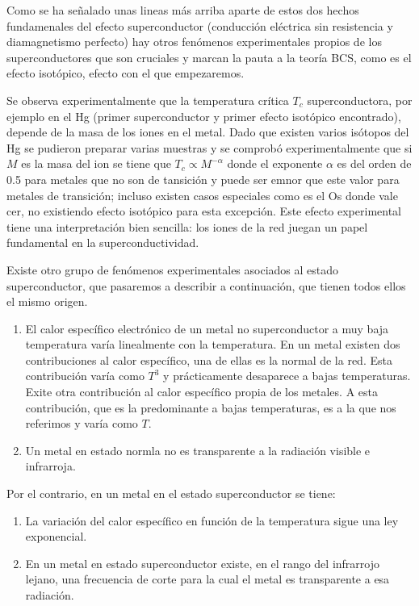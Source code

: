 Como se ha señalado unas lineas más arriba aparte de estos dos hechos fundamenales del efecto superconductor (conducción eléctrica sin resistencia y diamagnetismo perfecto) hay otros fenómenos experimentales propios de los superconductores que son cruciales y marcan la pauta a la teoría BCS, como es el efecto isotópico, efecto con el que empezaremos.

Se observa experimentalmente que la temperatura crítica $T_c$ superconductora, por ejemplo en el Hg (primer superconductor y primer efecto isotópico encontrado), depende de la masa de los iones en el metal. Dado que existen varios isótopos del Hg se pudieron preparar varias muestras y se comprobó experimentalmente que si $M$ es la masa del ion se tiene que $T_c \propto M^{-\alpha}$ donde el exponente $\alpha$ es del orden de 0.5 para metales que no son de tansición y puede ser emnor que este valor para metales de transición; incluso existen casos especiales como es el Os donde vale cer, no existiendo efecto isotópico para esta excepción. Este efecto experimental tiene una interpretación bien sencilla: los iones de la red juegan un papel fundamental en la superconductividad.

Existe otro grupo de fenómenos experimentales asociados al estado superconductor, que pasaremos a describir a continuación, que tienen todos ellos el mismo origen.

\begin{enumerate}
    \item El calor específico electrónico de un metal no superconductor a muy baja temperatura varía linealmente con la temperatura. En un metal existen dos contribuciones al calor específico, una de ellas es la normal de la red. Esta contribución varía como $T^3$ y prácticamente desaparece a bajas temperaturas. Exite otra contribución al calor específico propia de los metales. A esta contribución, que es la predominante a bajas temperaturas, es a la que nos referimos y varía como $T$.
    \item Un metal en estado normla no es transparente a la radiación visible e infrarroja.
\end{enumerate}

Por el contrario, en un metal en el estado superconductor se tiene:

\begin{enumerate}
    \item La variación del calor específico en función de la temperatura sigue una ley exponencial.
    \item En un metal en estado superconductor existe, en el rango del infrarrojo lejano, una frecuencia de corte para la cual el metal es transparente a esa radiación.
\end{enumerate}

